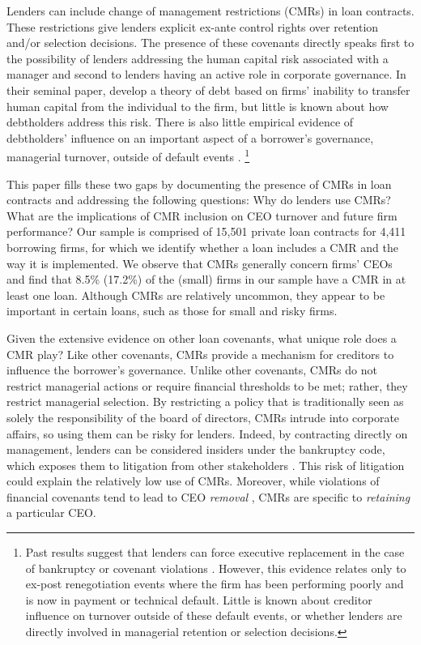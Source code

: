 \documentclass[a4paper,12pt]{article}
\begin{document}
\noindent
Lenders can include change of management restrictions (CMRs) in loan contracts.
These restrictions give lenders explicit ex-ante control rights over retention and/or selection decisions.
The presence of these covenants directly speaks first to the possibility of lenders addressing the human capital risk associated with a manager and second to lenders having an active role in corporate governance.
In their seminal paper, \cite{Hart_1994} develop a theory of debt based on firms' inability to transfer human capital from the individual to the firm, but little is known about how debtholders address this risk.
There is also little empirical evidence of debtholders' influence on an important aspect of a borrower's governance, managerial turnover, outside of default events \citep{Shleifer_1997, Roberts_2009b}.%
	\footnote{Past results suggest that lenders can force executive replacement in the case of bankruptcy \citep{Gilson_1989} or covenant violations \citep{Nini_2012}. However, this evidence relates only to ex-post renegotiation events where the firm has been performing poorly and is now in payment or technical default. Little is known about creditor influence on turnover outside of these default events, or whether lenders are directly involved in managerial retention or selection decisions.}


This paper fills these two gaps by documenting the presence of CMRs in loan contracts and addressing the following questions: Why do lenders use CMRs? What are the implications of CMR inclusion on CEO turnover and future firm performance?
Our sample is comprised of 15,501 private loan contracts for 4,411 borrowing firms, for which we identify whether a loan includes a CMR and the way it is implemented.
We observe that CMRs generally concern firms' CEOs and find that 8.5\% (17.2\%) of the (small) firms in our sample have a CMR in at least one loan.
Although CMRs are relatively uncommon, they appear to be important in certain loans, such as those for small and risky firms. 


Given the extensive evidence on other loan covenants, what unique role does a CMR play? 
Like other covenants, CMRs provide a mechanism for creditors to influence the borrower's governance.
Unlike other covenants, CMRs do not restrict managerial actions or require financial thresholds to be met; rather, they restrict managerial selection.
By restricting a policy that is traditionally seen as solely the responsibility of the board of directors, CMRs intrude into corporate affairs, so using them can be risky for lenders.
Indeed, by contracting directly on management, lenders can be considered insiders under the bankruptcy code, which exposes them to litigation from other stakeholders \citep{Leichtling_1997}.
This risk of litigation could explain the relatively low use of CMRs.  
Moreover, while violations of financial covenants tend to lead to CEO \textit{removal} \citep{Nini_2012}, CMRs are specific to \textit{retaining} a particular CEO.  
\end{document}
